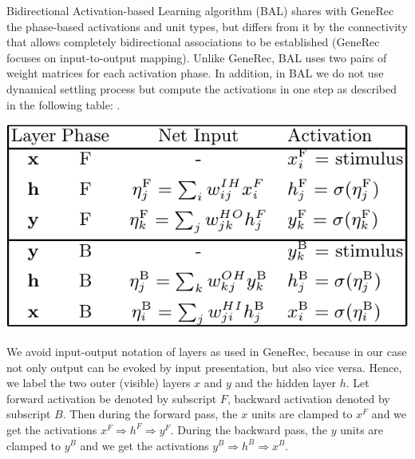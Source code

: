 
Bidirectional Activation-based Learning algorithm (BAL) shares with GeneRec
the phase-based activations and unit types, but differs from it by the connectivity
that allows completely bidirectional associations to be established (GeneRec
focuses on input-to-output mapping). Unlike GeneRec, BAL uses two pairs of
weight matrices for each activation phase. In addition, in BAL we do not use
dynamical settling process but compute the activations in one step as described
in the following table: \cite{farkas2013bal}.

\begin{center} 
\includegraphics{img/table_bal.png} 
\cite{farkas2013bal} 
\end{center}

We avoid input-output notation of layers as used in GeneRec, because in our
case not only output can be evoked by input presentation, but also vice versa.
Hence, we label the two outer (visible) layers $x$ and $y$ and the hidden layer $h$.
Let forward activation be denoted by subscript $F$, backward activation denoted
by subscript $B$. Then during the forward pass, the $x$ units are clamped to $x^F$
and we get the activations $x^F \Rightarrow h^F \Rightarrow y^F$. During the backward pass, the $y$
units are clamped to $y^B$ and we get the activations $y^B \Rightarrow h^B \Rightarrow x^B$.

